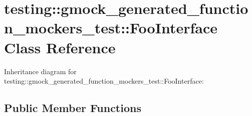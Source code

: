 \hypertarget{classtesting_1_1gmock__generated__function__mockers__test_1_1_foo_interface}{}\section{testing\+:\+:gmock\+\_\+generated\+\_\+function\+\_\+mockers\+\_\+test\+:\+:Foo\+Interface Class Reference}
\label{classtesting_1_1gmock__generated__function__mockers__test_1_1_foo_interface}


Inheritance diagram for testing\+:\+:gmock\+\_\+generated\+\_\+function\+\_\+mockers\+\_\+test\+:\+:Foo\+Interface\+:
\subsection*{Public Member Functions}
